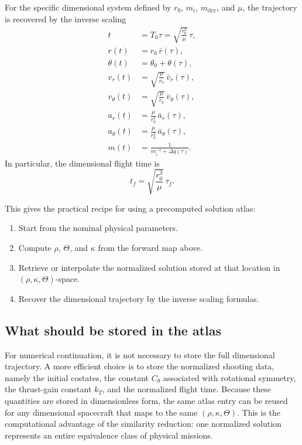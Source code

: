 \documentclass[journal, a4paper]{IEEEtran}
\begin{document}
For the specific dimensional system defined by \(r_0\), \(m_i\), \(m_\mathrm{dry}\), and \(\mu\), the trajectory is recovered by the inverse scaling
\begin{align}
  t &= T_0\tau = \sqrt{\frac{r_0^3}{\mu}}\,\tau, \\
  r(t) &= r_0\,\bar r(\tau), \\
  \theta(t) &= \theta_0 + \theta(\tau), \\
  v_r(t) &= \sqrt{\frac{\mu}{r_0}}\,\bar v_r(\tau), \\
  v_\theta(t) &= \sqrt{\frac{\mu}{r_0}}\,\bar v_\theta(\tau), \\
  a_r(t) &= \frac{\mu}{r_0^2}\,\bar a_r(\tau), \\
  a_\theta(t) &= \frac{\mu}{r_0^2}\,\bar a_\theta(\tau), \\
  m(t) &= \frac{1}{m_i^{-1}+\Delta q(\tau)}.
\end{align}
In particular, the dimensional flight time is
\begin{equation}
  t_f = \sqrt{\frac{r_0^3}{\mu}}\,\tau_f.
\end{equation}

This gives the practical recipe for using a precomputed solution atlas:
\begin{enumerate}
    \item Start from the nominal physical parameters.
    \item Compute \(\rho\), \(\Theta\), and \(\kappa\) from the forward map above.
    \item Retrieve or interpolate the normalized solution stored at that location in \((\rho,\kappa,\Theta)\)-space.
    \item Recover the dimensional trajectory by the inverse scaling formulas.
\end{enumerate}

\subsection{What should be stored in the atlas}
For numerical continuation, it is not necessary to store the full dimensional trajectory. 
A more efficient choice is to store the normalized shooting data, namely the initial costates, the constant \(C_\theta\) associated with rotational symmetry, the thrust-gain constant \(k_T\), and the normalized flight time. 
Because these quantities are stored in dimensionless form, the same atlas entry can be reused for any dimensional spacecraft that maps to the same \((\rho,\kappa,\Theta)\). 
This is the computational advantage of the similarity reduction: one normalized solution represents an entire equivalence class of physical missions.
\end{document}
